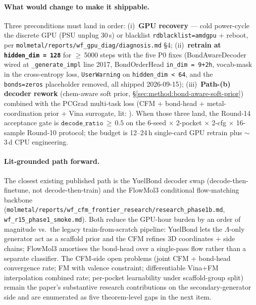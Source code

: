 \begin{itemize}
    \paragraph{What would change to make it shippable.}
    Three preconditions must land in order:
    (i)~\textbf{GPU recovery} --- cold power-cycle the discrete
    GPU (PSU unplug 30\,s) or blacklist
    \texttt{rdblacklist=amdgpu} + reboot, per
    \texttt{molmetal/reports/wf\_gpu\_diag/diagnosis.md}
    \S4;
    (ii)~\textbf{retrain at \texttt{hidden\_dim\,=\,128}} for
    $\geq$\,5000 steps with the five P0 fixes (BondAwareDecoder
    wired at \texttt{\_generate\_impl} line 2017, BondOrderHead
    \texttt{in\_dim\,=\,9+2h}, vocab-mask in the cross-entropy
    loss, \texttt{UserWarning} on \texttt{hidden\_dim\,<\,64},
    and the \texttt{bonds=zeros} placeholder removed, all
    shipped 2026-09-15);
    (iii)~\textbf{Path-(b) decoder rework} (chem-aware soft
    prior, \S\ref{sec:method:bond-aware-soft-prior}) combined
    with the PCGrad multi-task loss (CFM + bond-head +
    metal-coordination prior + Vina surrogate, lit:
    \cite{yu2020pcgrad, lipman2023cfm}). When those three
    land, the Round-14 acceptance gate is
    $\texttt{decode\_ratio}\,\geq\,0.5$ on the 6-seed $\times$
    2-pocket $\times$ 2-cfg $\times$ 16-sample Round-10
    protocol; the budget is 12--24\,h single-card GPU retrain
    plus $\sim$3\,d CPU engineering.

    \paragraph{Lit-grounded path forward.}
    The closest existing published path is the YuelBond decoder
    swap (decode-then-finetune, not decode-then-train) and the
    FlowMol3 conditional flow-matching backbone
    (\texttt{molmetal/reports/wf\_cfm\_frontier\_research/research\_phase1b.md},
    \texttt{wf\_r15\_phase1\_smoke.md}). Both reduce the
    GPU-hour burden by an order of magnitude vs.\ the
    legacy train-from-scratch pipeline: YuelBond lets the
    $\Lambda$-only generator act as a scaffold prior and
    the CFM refines 3D coordinates + side chains; FlowMol3
    amortises the bond-head over a single-pass flow rather
    than a separate classifier. The CFM-side open problems
    (joint CFM + bond-head convergence rate; FM with valence
    constraint; differentiable Vina+FM interpolation combined
    rate; per-pocket learnability under scaffold-group split)
    remain the paper's substantive research contributions
    on the secondary-generator side and are enumerated as
    five theorem-level gaps in the next item.


\end{itemize}

